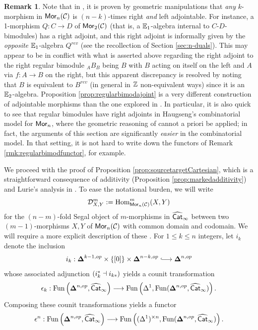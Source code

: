 \documentclass[10pt, reqno, twoside
, final
]{amsart}
\numberwithin{equation}{subsection}%
\theoremstyle{definition}
\theoremstyle{definition}
\theoremstyle{definition}
\theoremstyle{definition}
\theoremstyle{definition}
\theoremstyle{definition}
\theoremstyle{definition}
\theoremstyle{definition}
\theoremstyle{definition}
\theoremstyle{plain}
\theoremstyle{definition}
\theoremstyle{plain}
\theoremstyle{definition}
\theoremstyle{plain}
\theoremstyle{definition}
\newtheorem{rmk}[defn]{Remark}
\theoremstyle{definition}
\theoremstyle{plain}
\theoremstyle{plain}
\theoremstyle{definition}
\theoremstyle{plain}
\theoremstyle{plain}
\theoremstyle{plain}
\begin{document}
\begin{rmk}
Note that in \cite{GS}, it is proven by geometric manipulations that \emph{any} $k$-morphism in $\mathsf{Mor}_n(\mathcal{C})$ is $(n-k)$-times right \emph{and} left adjointable. For instance, a 1-morphism $Q:C\rightarrow D$ of $\mathsf{Mor}_2(\mathcal{C})$ (that is, a $\mathbb{E}_1$-algebra internal to $C$-$D$-bimodules) has a right adjoint, and this right adjoint is informally given by the \emph{opposite} $\mathbb{E}_1$-algebra $Q^{rev}$ (see the recollection of Section \ref{sec:n-duals}). This may appear to be in conflict with what is asserted above regarding the right adjoint to the right regular bimodule ${}_AB_B$ being $B$ with $B$ acting on itself on the left and $A$ via $f:A\rightarrow B$ on the right, but this apparent discrepancy is resolved by noting that $B$ is equivalent to $B^{rev}$ (in general in $\mathbb{Z}$ non-equivalent ways) since it is an $\mathbb{E}_2$-algebra. Proposition \ref{prop:regularbimodajoint} is a very different construction of adjointable morphisms than the one explored in \cite{GS}. In particular, it is also quick to see that regular bimodules have right adjoints in Haugseng's combinatorial model \cite{HaugsengEn} for $\mathsf{Mor}_n$, where the geometric reasoning of \cite{GS} cannot a priori be applied; in fact, the arguments of this section are significantly \emph{easier} in the combinatorial model. In that setting, it is not hard to write down the functors of Remark \ref{rmk:regularbimodfunctor}, for example.
\end{rmk}
We proceed with the proof of Proposition \ref{prop:sourcetargetCartesian}, which is a straightforward consequence of additivity (Proposition \ref{prop:markedadditivity}) and Lurie's analysis in \cite[Section 4.3]{LurHA}. To ease the notational burden, we will write
\[  \mathcal{D}^m_{X,Y} := \mathrm{Hom}^m_{\mathsf{Mor}_n(\mathcal{C})}(X,Y)  \]
for the $(n-m)$-fold Segal object of $m$-morphisms in $\widehat{\mathsf{Cat}}_{\infty}$ between two $(m-1)$-morphisms $X,Y$ of $\mathsf{Mor}_n(\mathcal{C})$ with common domain and codomain. We will require a more explicit description of these \infcatst. For $1\leq k\leq n$ integers, let $i_k$ denote the inclusion
\[ i_k: \simp^{{k-1},op}\times \{[0]\} \times \simp^{{n-k},op}\hooklongrightarrow \simpopn  \]
whose associated adjunction $(i_{k}^*\dashv i_{k*})$ yields a counit transformation
\[ \epsilon_{k}: \mathrm{Fun}\left(\boldsymbol{\Delta}^{n,op},\widehat{\mathsf{Cat}}_{\infty}\right)\longrightarrow \mathrm{Fun}\left(\Delta^1, \mathrm{Fun}(\boldsymbol{\Delta}^{n,op},\widehat{\mathsf{Cat}}_{\infty})\right).  \]
Composing these counit transformations yields a functor
\[ \epsilon^n:\mathrm{Fun}\left(\boldsymbol{\Delta}^{n,op},\widehat{\mathsf{Cat}}_{\infty}\right)\longrightarrow \mathrm{Fun}\left((\Delta^1)^{\times n}, \mathrm{Fun}(\boldsymbol{\Delta}^{n,op},\widehat{\mathsf{Cat}}_{\infty})\right).  \]
\end{document}
